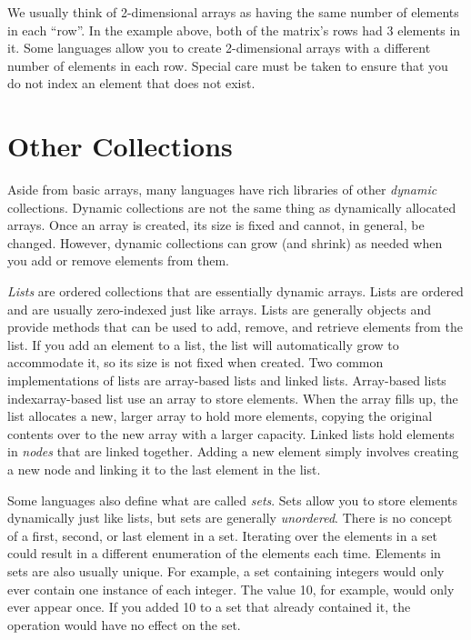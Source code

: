We usually think of 2-dimensional arrays as having the same number
of elements in each ``row''.  In the example above, both of the matrix's
rows had 3 elements in it.  Some languages allow you to create
2-dimensional arrays with a different number of elements in each
row.  Special care must be taken to ensure that you do not index an 
element that does not exist.

\section{Other Collections}

Aside from basic arrays, many languages have rich libraries of other
\emph{dynamic} collections.  Dynamic collections are not the same
thing as dynamically allocated arrays.  Once an array is  
created, its size is fixed and cannot, in general, be changed.  However,
dynamic collections can grow (and shrink) as needed when you 
add or remove elements from them.

\emph{Lists} are ordered collections that are essentially dynamic arrays.  
Lists are ordered and are usually zero-indexed just like arrays.  Lists
are generally objects and provide methods that can be used to add, 
remove, and retrieve elements from the list.  If you add an element
to a list, the list will automatically grow to accommodate it, so its size
is not fixed when created.  Two common implementations of lists are
array-based lists and linked lists.  Array-based lists 
index{array-based list} use an array to
store elements.  When the array fills up, the list allocates a new, 
larger array to hold more elements, copying the original contents
over to the new array with a larger capacity.  Linked lists  hold elements
in \emph{nodes} that are linked together.  Adding a new element
simply involves creating a new node and linking it to the last element
in the list.

Some languages also define what are called  \emph{sets}.  Sets allow
you to store elements dynamically just like lists, but sets are generally
\emph{unordered}.  There is no concept of a first, second, or last 
element in a set.  Iterating over the elements in a set could result
in a different enumeration of the elements each time.  Elements in
sets are also usually unique.  For example, a set containing integers
would only ever contain one instance of each integer.  The value 10,
for example, would only ever appear once.  If you added 10 to a set
that already contained it, the operation would have no effect on the
set.

